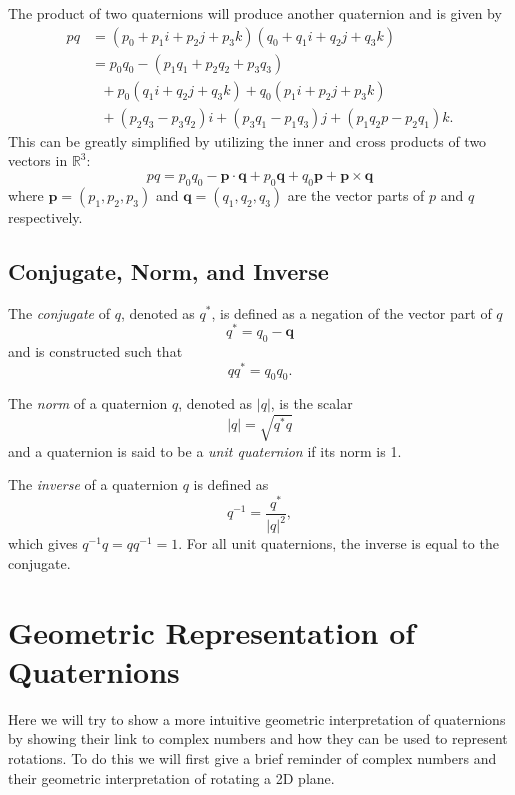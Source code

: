 The product of two quaternions will produce another quaternion and is given by
\begin{align*}
pq &= (p_0 + p_1\textit{i} + p_2\textit{j} + p_3\textit{k})(q_0 + q_1\textit{i} + q_2\textit{j} + q_3\textit{k}) \nonumber \\
&= p_0q_0 - (p_1q_1 + p_2q_2 + p_3q_3) \nonumber \\
&~~~ + p_0(q_1\textit{i} + q_2\textit{j} + q_3\textit{k}) + q_0(p_1\textit{i} + p_2\textit{j} + p_3\textit{k}) \nonumber \\
&~~~ + (p_2q_3 - p_3q_2)\textit{i} + (p_3q_1 - p_1q_3)\textit{j} + (p_1q_2p - p_2q_1)\textit{k}. \nonumber
\end{align*}
This can be greatly simplified by utilizing the inner and cross products of two vectors in $\mathbb{R}^3$:
\begin{equation}
pq = p_0q_0 - \textbf{p}\cdot\textbf{q} + p_0\textbf{q} + q_0\textbf{p} + \textbf{p} \times \textbf{q}
\label{eq:quatmult}
\end{equation}
where $\textbf{p} = (p_1,p_2,p_3)$ and $\textbf{q} = (q_1,q_2,q_3)$ are the vector parts of $p$ and $q$ respectively.


\subsection{Conjugate, Norm, and Inverse}
The \textit{conjugate} of $q$, denoted as $q^*$, is defined as a negation of the vector part of $q$
\begin{equation}
q^* = q_0 - \textbf{q}
\label{eq:quatconjugate}
\end{equation}
and is constructed such that
\begin{equation*}
qq^* = q_0q_0.
\end{equation*}

The \textit{norm} of a quaternion $q$, denoted as $|q|$, is the scalar
\begin{equation*}
|q| = \sqrt{q^*q}
\end{equation*}
and a quaternion is said to be a \textit{unit quaternion} if its norm is 1.

The \textit{inverse} of a quaternion $q$ is defined as 
\begin{equation*}
q^{-1} = \frac{q^*}{|q|^2},
\end{equation*}
which gives $q^{-1}q = qq^{-1} = 1.$
For all unit quaternions, the inverse is equal to the conjugate.


\section{Geometric Representation of Quaternions}
Here we will try to show a more intuitive geometric interpretation of quaternions by showing their link to complex numbers and how they can be used to represent rotations.
To do this we will first give a brief reminder of complex numbers and their geometric interpretation of rotating a 2D plane.

